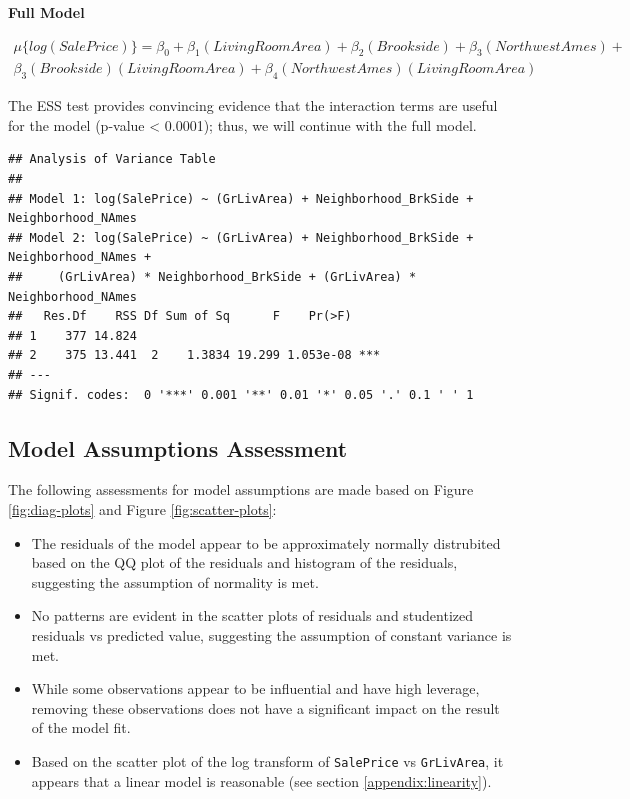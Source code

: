 \documentclass[american,]{article}
\providecommand{\tightlist}{%
  \setlength{\itemsep}{0pt}\setlength{\parskip}{0pt}}
\begin{document}
\textbf{Full Model}

\begin{align}
\mu \lbrace log(SalePrice) \rbrace = \beta_0 + \beta_1(LivingRoomArea) +  \beta_2(Brookside) +\beta_3(NorthwestAmes) + \nonumber\\
\beta_3(Brookside)(LivingRoomArea) + \beta_4(NorthwestAmes)(LivingRoomArea) \label{eq:full}
\end{align}

The ESS test provides convincing evidence that the interaction terms are
useful for the model (p-value \textless{} 0.0001); thus, we will
continue with the full model.

\begin{verbatim}
## Analysis of Variance Table
## 
## Model 1: log(SalePrice) ~ (GrLivArea) + Neighborhood_BrkSide + Neighborhood_NAmes
## Model 2: log(SalePrice) ~ (GrLivArea) + Neighborhood_BrkSide + Neighborhood_NAmes + 
##     (GrLivArea) * Neighborhood_BrkSide + (GrLivArea) * Neighborhood_NAmes
##   Res.Df    RSS Df Sum of Sq      F    Pr(>F)    
## 1    377 14.824                                  
## 2    375 13.441  2    1.3834 19.299 1.053e-08 ***
## ---
## Signif. codes:  0 '***' 0.001 '**' 0.01 '*' 0.05 '.' 0.1 ' ' 1
\end{verbatim}

\hypertarget{model-assumptions-assessment}{%
\subsection{Model Assumptions
Assessment}\label{model-assumptions-assessment}}

The following assessments for model assumptions are made based on Figure
\ref{fig:diag-plots} and Figure \ref{fig:scatter-plots}:

\begin{itemize}
\tightlist
\item
  The residuals of the model appear to be approximately normally
  distrubited based on the QQ plot of the residuals and histogram of the
  residuals, suggesting the assumption of normality is met.
\item
  No patterns are evident in the scatter plots of residuals and
  studentized residuals vs predicted value, suggesting the assumption of
  constant variance is met.
\item
  While some observations appear to be influential and have high
  leverage, removing these observations does not have a significant
  impact on the result of the model fit.
\item
  Based on the scatter plot of the log transform of \texttt{SalePrice}
  vs \texttt{GrLivArea}, it appears that a linear model is reasonable
  (see section \ref{appendix:linearity}).
\end{itemize}
\end{document}
